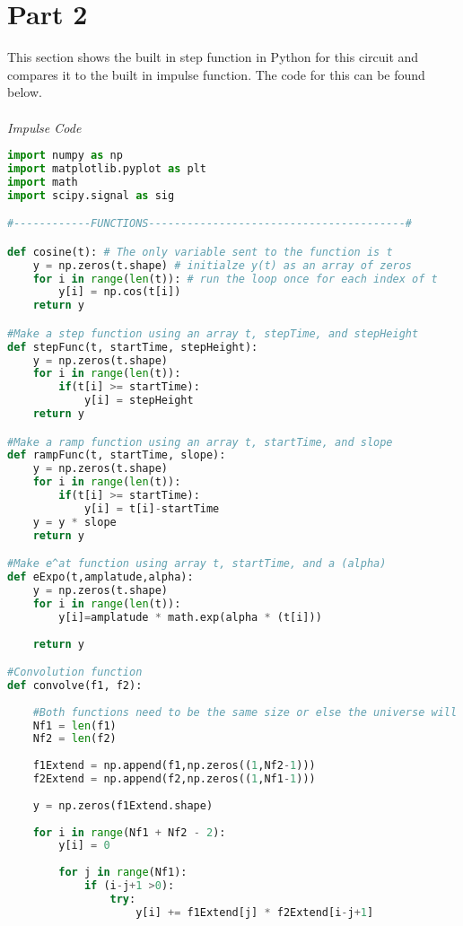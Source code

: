 \documentclass[12pt,a4paper]{article}
\begin{document}
\section{Part 2}
This section shows the built in step function in Python for this circuit and compares it to the built in impulse function. The code for this can be found below.\\
\\
\textit{Impulse Code}
\begin{lstlisting}[language=Python]
import numpy as np
import matplotlib.pyplot as plt
import math
import scipy.signal as sig

#------------FUNCTIONS----------------------------------------#

def cosine(t): # The only variable sent to the function is t
    y = np.zeros(t.shape) # initialze y(t) as an array of zeros
    for i in range(len(t)): # run the loop once for each index of t
        y[i] = np.cos(t[i])
    return y

#Make a step function using an array t, stepTime, and stepHeight
def stepFunc(t, startTime, stepHeight):
    y = np.zeros(t.shape)
    for i in range(len(t)):
        if(t[i] >= startTime):
            y[i] = stepHeight
    return y

#Make a ramp function using an array t, startTime, and slope
def rampFunc(t, startTime, slope):
    y = np.zeros(t.shape)
    for i in range(len(t)):
        if(t[i] >= startTime):
            y[i] = t[i]-startTime
    y = y * slope
    return y

#Make e^at function using array t, startTime, and a (alpha)
def eExpo(t,amplatude,alpha):
    y = np.zeros(t.shape)
    for i in range(len(t)):
        y[i]=amplatude * math.exp(alpha * (t[i]))
    
    return y

#Convolution function
def convolve(f1, f2):
    
    #Both functions need to be the same size or else the universe will explode!
    Nf1 = len(f1)
    Nf2 = len(f2)
    
    f1Extend = np.append(f1,np.zeros((1,Nf2-1)))
    f2Extend = np.append(f2,np.zeros((1,Nf1-1)))
    
    y = np.zeros(f1Extend.shape)
    
    for i in range(Nf1 + Nf2 - 2):
        y[i] = 0
        
        for j in range(Nf1):
            if (i-j+1 >0):
                try:
                    y[i] += f1Extend[j] * f2Extend[i-j+1]
                

\end{lstlisting}
\end{document}
